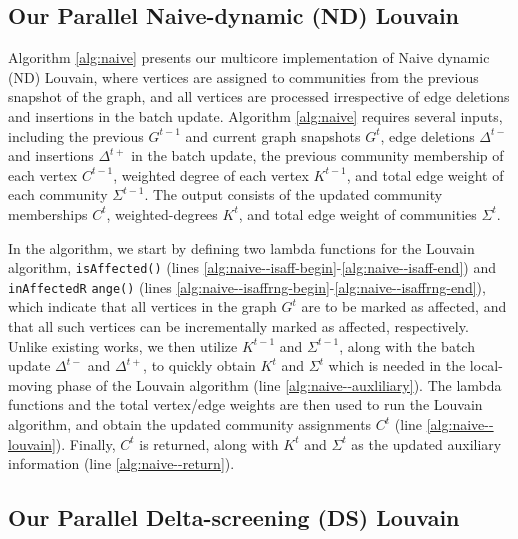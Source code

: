 \subsection{Our Parallel Naive-dynamic (ND) Louvain}
\label{sec:our-naive}

Algorithm \ref{alg:naive} presents our multicore implementation of Naive dynamic (ND) Louvain, where vertices are assigned to communities from the previous snapshot of the graph, and all vertices are processed irrespective of edge deletions and insertions in the batch update. Algorithm \ref{alg:naive} requires several inputs, including the previous $G^{t-1}$ and current graph snapshots $G^t$, edge deletions $\Delta^{t-}$ and insertions $\Delta^{t+}$ in the batch update, the previous community membership of each vertex $C^{t-1}$, weighted degree of each vertex $K^{t-1}$, and total edge weight of each community $\Sigma^{t-1}$. The output consists of the updated community memberships $C^t$, weighted-degrees $K^t$, and total edge weight of communities $\Sigma^t$.

In the algorithm, we start by defining two lambda functions for the Louvain algorithm, \texttt{isAffected()} (lines \ref{alg:naive--isaff-begin}-\ref{alg:naive--isaff-end}) and \texttt{inAffectedR} \texttt{ange()} (lines \ref{alg:naive--isaffrng-begin}-\ref{alg:naive--isaffrng-end}), which indicate that all vertices in the graph $G^t$ are to be marked as affected, and that all such vertices can be incrementally marked as affected, respectively. Unlike existing works, we then utilize $K^{t-1}$ and $\Sigma^{t-1}$, along with the batch update $\Delta^{t-}$ and $\Delta^{t+}$, to quickly obtain $K^t$ and $\Sigma^t$ which is needed in the local-moving phase of the Louvain algorithm (line \ref{alg:naive--auxliliary}). The lambda functions and the total vertex/edge weights are then used to run the Louvain algorithm, and obtain the updated community assignments $C^t$ (line \ref{alg:naive--louvain}). Finally, $C^t$ is returned, along with $K^t$ and $\Sigma^t$ as the updated auxiliary information (line \ref{alg:naive--return}).




\subsection{Our Parallel Delta-screening (DS) Louvain}
\label{sec:our-delta}

